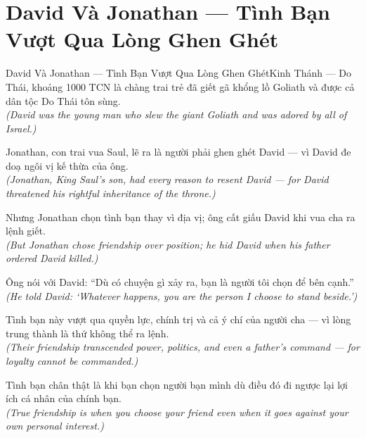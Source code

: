 \section{David Và Jonathan --- Tình Bạn Vượt Qua Lòng Ghen Ghét}
\begin{truyen}{David Và Jonathan --- Tình Bạn Vượt Qua Lòng Ghen Ghét}{Kinh Thánh --- Do Thái, khoảng 1000 TCN}
 là chàng trai trẻ đã giết gã khổng lồ Goliath và được cả dân tộc Do Thái tôn sùng.\\[4pt]
\textit{(David was the young man who slew the giant Goliath and was adored by all of Israel.)}

Jonathan, con trai vua Saul, lẽ ra là người phải ghen ghét David --- vì David đe doạ ngôi vị kế thừa của ông.\\[4pt]
\textit{(Jonathan, King Saul's son, had every reason to resent David --- for David threatened his rightful inheritance of the throne.)}

Nhưng Jonathan chọn tình bạn thay vì địa vị; ông cất giấu David khi vua cha ra lệnh giết.\\[4pt]
\textit{(But Jonathan chose friendship over position; he hid David when his father ordered David killed.)}

Ông nói với David: ``Dù có chuyện gì xảy ra, bạn là người tôi chọn để bên cạnh.''\\[4pt]
\textit{(He told David: `Whatever happens, you are the person I choose to stand beside.')}

Tình bạn này vượt qua quyền lực, chính trị và cả ý chí của người cha --- vì lòng trung thành là thứ không thể ra lệnh.\\[4pt]
\textit{(Their friendship transcended power, politics, and even a father's command --- for loyalty cannot be commanded.)}

\end{truyen}
\begin{baihoc}
  Tình bạn chân thật là khi bạn chọn người bạn mình dù điều đó đi ngược lại lợi ích cá nhân của chính bạn.\\[4pt]
  \textit{(True friendship is when you choose your friend even when it goes against your own personal interest.)}
\end{baihoc}

